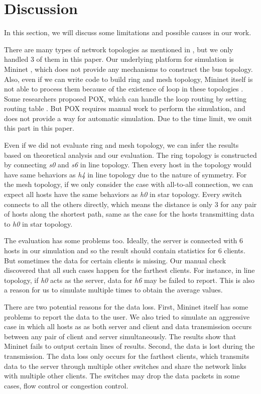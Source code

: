 \section{Discussion} \label{sec:discussion}

In this section, we will discuss some limitations and possible causes in our work.

There are many types of network topologies as mentioned in \cite{NetworkTopo:wiki},
but we only handled 3 of them in this paper. Our underlying platform for simulation
is Mininet \cite{Mininet:official}, which does not provide any mechanisms to construct
the bus topology. Also, even if we can write code to build ring and mesh topology,
Mininet itself is not able to process them because of the existence of loop in these
topologies \cite{MininetFAQ:web}. Some researchers proposed POX, which can handle the
loop routing by setting routing table \cite{POX:web}. But POX requires manual work 
to perform the simulation, and does not provide a way for automatic simulation. 
Due to the time limit, we omit this part in this paper.

Even if we did not evaluate ring and mesh topology, we can infer the results based on 
theoretical analysis and our evaluation. The ring topology is constructed by connecting
{\it s0} and {\it s6} in line topology. Then every host in the topology would have same 
behaviors as {\it h4} in line topology due to the nature of symmetry. 
For the mesh topology, if we only consider the case with all-to-all connection, we can
expect all hosts have the same behaviors as {\it h0} in star topology. Every switch 
connects to all the others directly, which means the distance is only 3 for any pair
of hosts along the shortest path, same as the case for the hosts transmitting data to 
{\it h0} in star topology. 

The evaluation has some problems too. Ideally, the server is connected with 6 hosts in
our simulation and so the result should contain statistics for 6 clients. But sometimes
the data for certain clients is missing. Our manual check discovered that all such cases 
happen for the farthest clients. For instance, in line topology, if {\it h0} acts as the 
server, data for {\it h6} may be failed to report. This is also a reason for us to 
simulate multiple times to obtain the average values. 

There are two potential reasons for the data loss. First, Mininet itself has some problems 
to report the data to the user. We also tried to simulate an aggressive case in which all 
hosts as as both server and client and data transmission occurs between any pair of 
client and server simultaneously. The results show that Mininet fails to output certain lines
of results. Second, the data is lost during the transmission. The data loss only occurs for 
the farthest clients, which transmits data to the server through multiple other switches and 
share the network links with multiple other clients. 
The switches may drop the data packets in some cases, \eg flow control or congestion control.

